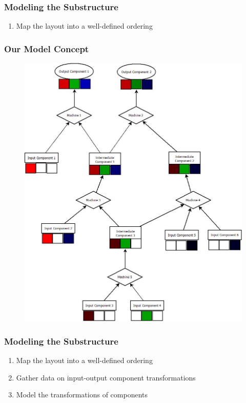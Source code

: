 \documentclass{beamer}
\begin{document}
\begin{frame}
\frametitle{Modeling the Substructure}
\begin{enumerate}
\item Map the layout into a well-defined ordering
\end{enumerate}
\end{frame}

\begin{frame}
\frametitle{Our Model Concept}
\begin{figure}
\includegraphics[width=0.5\linewidth]{BaseModel.jpeg}
\end{figure}
\end{frame}

\begin{frame}
\frametitle{Modeling the Substructure}
\begin{enumerate}
\item Map the layout into a well-defined ordering
\item Gather data on input-output component transformations\pause
\item Model the transformations of components
\end{enumerate}
\end{frame}
\end{document}
